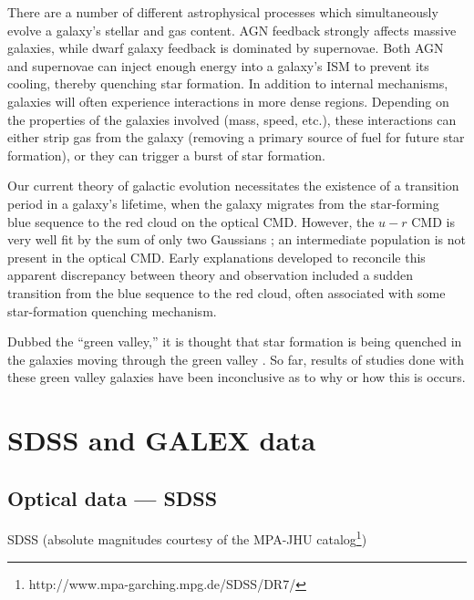 There are a number of different astrophysical processes which simultaneously 
evolve a galaxy's stellar and gas content.  AGN feedback strongly affects 
massive galaxies, while dwarf galaxy feedback is dominated by supernovae.  Both 
AGN and supernovae can inject enough energy into a galaxy's ISM to prevent its 
cooling, thereby quenching star formation.  In addition to internal mechanisms, 
galaxies will often experience interactions in more dense regions.  Depending on 
the properties of the galaxies involved (mass, speed, etc.), these interactions 
can either strip gas from the galaxy (removing a primary source of fuel for 
future star formation), or they can trigger a burst of star formation.

Our current theory of galactic evolution necessitates the existence of a 
transition period in a galaxy's lifetime, when the galaxy migrates from the 
star-forming blue sequence to the red cloud on the optical CMD.  However, the 
$u-r$ CMD is very well fit by the sum of only two Gaussians \citep{Strateva01, 
Baldry04}; an intermediate population is not present in the optical CMD.  Early 
explanations developed to reconcile this apparent discrepancy between theory and 
observation included a sudden transition from the blue sequence to the red 
cloud, often associated with some star-formation quenching mechanism.

Dubbed the ``green valley,'' it is thought that star formation 
is being quenched in the galaxies moving through the green valley 
\citep{Martin07}.  So far, results of studies done with these green valley 
galaxies have been inconclusive as to why or how this is occurs.



\section[Data]{SDSS and GALEX data}

\subsection{Optical data --- SDSS}
SDSS \citep{Abazajian09} (absolute magnitudes courtesy of the MPA-JHU 
catalog\footnote{http://www.mpa-garching.mpg.de/SDSS/DR7/})

